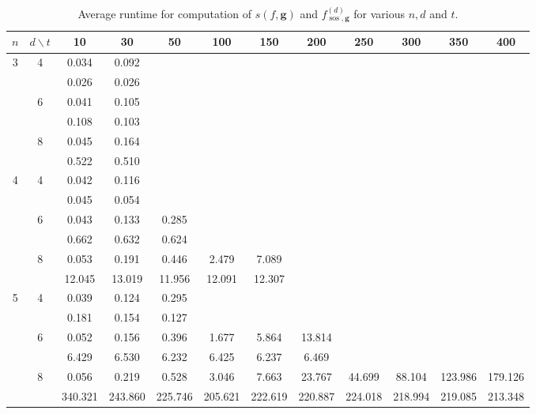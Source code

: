 \documentclass{amsart}
\theoremstyle{definition}
\begin{document}
\begin{table}[ht]{\footnotesize
\caption{Average runtime for computation of $s(f,\mathbf{g})$ and $f^{(d)}_{\operatorname{sos},\mathbf{g}}$
for various $n, d$ and $t$.}\label{runtimecmp}

\centering
\begin{tabular}{|c|c|cccccccccc|}
\hline
$n$ & $d\backslash t$ & 10 & 30 & 50 & 100 & 150 & 200 & 250 & 300 & 350 & 400 \\
\hline
\multirow{6}{*}{3} & \multirow{2}{*}{4} & 0.034 & 0.092 &  &  &  &  &  &  &  & \\
					&				   & 0.026 & 0.026 &  &  &  &  &  &  &  & \\
				  & \multirow{2}{*}{6} & 0.041 & 0.105 &  &  &  &  &  &  &  & \\
				    	&				   & 0.108 & 0.103 &  &  &  &  &  &  &  & \\
				  & \multirow{2}{*}{8} & 0.045 & 0.164 &  &  &  &  &  &  &  & \\
				  	&				   & 0.522 & 0.510 &  &  &  &  &  &  &  & \\
\hline
\multirow{6}{*}{4} & \multirow{2}{*}{4} & 0.042 & 0.116 &  &  &  &  &  &  &  & \\
					&				   & 0.045 & 0.054 &  &  &  &  &  &  &  & \\
				  & \multirow{2}{*}{6} & 0.043 & 0.133 & 0.285 &  &  &  &  &  &  & \\
				    	&				   & 0.662 & 0.632 & 0.624 &  &  &  &  &  &  & \\
				  & \multirow{2}{*}{8} & 0.053 & 0.191 & 0.446 & 2.479 & 7.089 &  &  &  &  & \\
				  	&				   & 12.045 & 13.019 & 11.956 & 12.091 & 12.307 &  &  &  &  & \\
\hline
\multirow{6}{*}{5} & \multirow{2}{*}{4} & 0.039 & 0.124 & 0.295 &  &  &  &  &  &  & \\
					&				   & 0.181 & 0.154 & 0.127 &  &  &  &  &  &  & \\
				  & \multirow{2}{*}{6} & 0.052 & 0.156 & 0.396 & 1.677 & 5.864 & 13.814 &  &  &  & \\
				    	&				   & 6.429 & 6.530 & 6.232 & 6.425 & 6.237 & 6.469 &  &  &  & \\
				  & \multirow{2}{*}{8} & 0.056 & 0.219 & 0.528 & 3.046 & 7.663 & 23.767 & 44.699 & 88.104 & 123.986 & 179.126\\
				  	&				   & 340.321 & 243.860 & 225.746 & 205.621 & 222.619 & 220.887 & 224.018 & 218.994 & 219.085 & 213.348\\
\hline

\end{tabular}}
\end{table}
\end{document}
